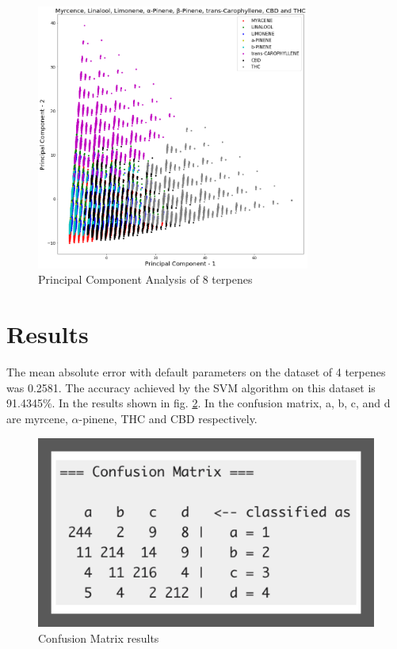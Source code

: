 \documentclass[12pt, a4paper]{article}
\begin{document}
\begin{figure}[!ht]
\centering
    \begin{center}
        \includegraphics[width=9cm]{2dPCA.png}
    \end{center}
    \caption{Principal Component Analysis of 8 terpenes}
    \label{fig:2dPCAfor8}
\end{figure}


\section{Results}
The mean absolute error with default parameters on the dataset of 4 terpenes was 0.2581. The accuracy achieved by the SVM algorithm \cite{Cortes1995} on this dataset is 91.4345\%. In the results shown in fig. \ref{fig:confMat}.
In the confusion matrix, a, b, c, and d are myrcene, $\alpha$-pinene, THC and CBD respectively.

\begin{figure}[!ht]
\centering
    \begin{center}
        \includegraphics[width = 9 cm]{confusionMatrixforGSS2020.png}
    \end{center}
    \caption{Confusion Matrix results}
    \label{fig:confMat}
\end{figure}
\end{document}
